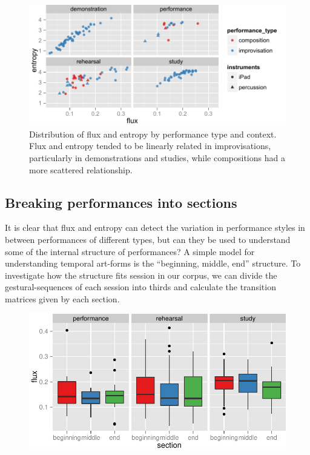 \documentclass{sigchi}
\begin{document}
\begin{figure}
  \centering
  \includegraphics[width=\linewidth]{figures/flux-entropy-distribution}
  \caption{Distribution of flux and entropy by performance type and
    context. Flux and entropy tended to be linearly related in
    improvisations, particularly in demonstrations and studies, while
    compositions had a more scattered relationship.
    \label{fig:flux-entropy-distribution}}
\end{figure}


\subsection{Breaking performances into sections}

It is clear that flux and entropy can detect the variation in
performance styles in between performances of different types, but can
they be used to understand some of the internal structure of
performances? A simple model for understanding temporal art-forms is
the ``beginning, middle, end'' structure. To investigate how the
structure fits session in our corpus, we can divide the
gestural-sequences of each session into thirds and calculate the
transition matrices given by each section.



\begin{figure}
  \centering
  \includegraphics[width=\linewidth]{figures/section-flux}
  \caption{
    \label{fig:section-flux}}
\end{figure}
\end{document}
